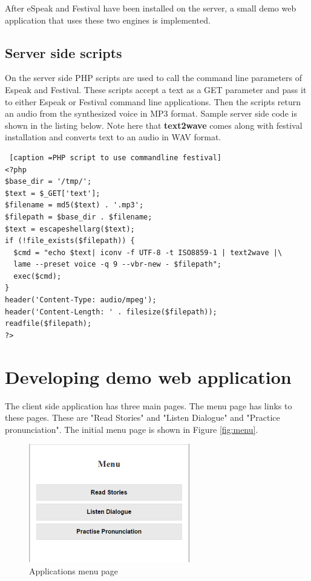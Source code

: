 \documentclass[11pt,a4paper,oneside,article]{memoir}
\begin{document}
After eSpeak and Festival have been installed on the server, a small demo web application that uses these two engines is implemented. 



\subsection{Server side scripts}
On the server side PHP scripts are used to call the command line parameters of Espeak and Festival. These scripts accept a text as a GET parameter and pass it to either Espeak or Festival command line applications. Then the scripts return an audio from the synthesized voice in MP3 format. Sample server side code is shown in the listing below. Note here that \textbf{text2wave} comes along with festival installation and converts text to an audio in WAV format.

\lstset{language=php}
\begin{minipage}{\linewidth}
\begin{lstlisting} [caption =PHP script to use commandline festival]
<?php
$base_dir = '/tmp/';
$text = $_GET['text'];
$filename = md5($text) . '.mp3';
$filepath = $base_dir . $filename;
$text = escapeshellarg($text);
if (!file_exists($filepath)) {
  $cmd = "echo $text| iconv -f UTF-8 -t ISO8859-1 | text2wave |\
  lame --preset voice -q 9 --vbr-new - $filepath";
  exec($cmd);
}
header('Content-Type: audio/mpeg');
header('Content-Length: ' . filesize($filepath));
readfile($filepath);
?>
\end{lstlisting}
\end{minipage}
\section{Developing demo web application}
The client side application has three main pages. The menu page has links to these pages. These are "Read Stories" and "Listen Dialogue" and "Practice pronunciation". The initial menu page is shown in Figure  \vref{fig:menu}.
\begin{figure}[h]
\includegraphics[width=7cm]{menu}
\caption{Applications menu page}
\label{fig:menu}
\end{figure}
\end{document}
